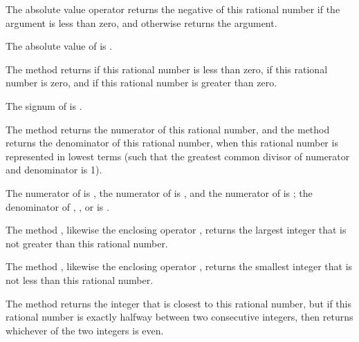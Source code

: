 The absolute value operator \EXP{\left|\ldots\right|} returns the negative of this rational number
if the argument is less than zero, and otherwise returns the argument.

The absolute value of  is .



The method  returns  if this rational number is less than zero,
 if this rational number is zero, and  if this rational number is greater than zero.

The signum of  is .



The method  returns the numerator of this rational number,
and the method  returns the denominator of this rational number,
when this rational number is represented in lowest terms (such that the greatest common divisor
of numerator and denominator is 1).

The numerator of \EXP{+\infty} is ,
the numerator of \EXP{-\infty} is ,
and the numerator of  is ;
the denominator of \EXP{+\infty}, \EXP{-\infty}, or  is .



The method , likewise the enclosing operator \EXP{\lfloor\ldots\rfloor},
returns the largest integer that is not greater than this rational number.

The method , likewise the enclosing operator \EXP{\lceil\ldots\rceil},
returns the smallest integer that is not less than this rational number.

The method  returns the integer that is closest to this rational number,
but if this rational number is exactly halfway between two consecutive integers,
then  returns whichever of the two integers is even.

